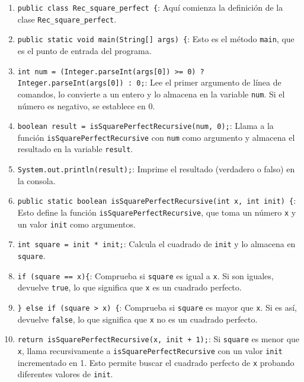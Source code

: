 \documentclass{article}
\begin{document}
\begin{enumerate}
  \item \texttt{public class Rec\_square\_perfect \{}: Aquí comienza la definición de la clase \texttt{Rec\_square\_perfect}.
  
  \item \texttt{public static void main(String[] args) \{}: Esto es el método \texttt{main}, que es el punto de entrada del programa.
  
  \item \texttt{int num = (Integer.parseInt(args[0]) >= 0) ? Integer.parseInt(args[0]) : 0;}: Lee el primer argumento de línea de comandos, lo convierte a un entero y lo almacena en la variable \texttt{num}. Si el número es negativo, se establece en 0.
  
  \item \texttt{boolean result = isSquarePerfectRecursive(num, 0);}: Llama a la función \texttt{isSquarePerfectRecursive} con \texttt{num} como argumento y almacena el resultado en la variable \texttt{result}.
  
  \item \texttt{System.out.println(result);}: Imprime el resultado (verdadero o falso) en la consola.
  
  \item \texttt{public static boolean isSquarePerfectRecursive(int x, int init) \{}: Esto define la función \texttt{isSquarePerfectRecursive}, que toma un número \texttt{x} y un valor \texttt{init} como argumentos.
  
  \item \texttt{int square = init * init;}: Calcula el cuadrado de \texttt{init} y lo almacena en \texttt{square}.
  
  \item \texttt{if (square == x)\{}: Comprueba si \texttt{square} es igual a \texttt{x}. Si son iguales, devuelve \texttt{true}, lo que significa que \texttt{x} es un cuadrado perfecto.
  
  \item \texttt{\} else if (square > x) \{}: Comprueba si \texttt{square} es mayor que \texttt{x}. Si es así, devuelve \texttt{false}, lo que significa que \texttt{x} no es un cuadrado perfecto.
  
  \item \texttt{return isSquarePerfectRecursive(x, init + 1);}: Si \texttt{square} es menor que \texttt{x}, llama recursivamente a \texttt{isSquarePerfectRecursive} con un valor \texttt{init} incrementado en 1. Esto permite buscar el cuadrado perfecto de \texttt{x} probando diferentes valores de \texttt{init}.
\end{enumerate}
\end{document}
